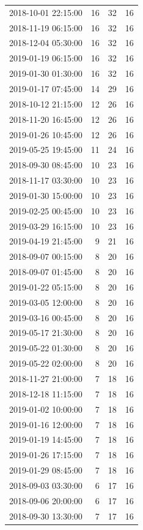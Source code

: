 \begin{tabular}{lrrr}
2018-10-01 22:15:00 & 16 & 32 & 16 \\
2018-11-19 06:15:00 & 16 & 32 & 16 \\
2018-12-04 05:30:00 & 16 & 32 & 16 \\
2019-01-19 06:15:00 & 16 & 32 & 16 \\
2019-01-30 01:30:00 & 16 & 32 & 16 \\
2019-01-17 07:45:00 & 14 & 29 & 16 \\
2018-10-12 21:15:00 & 12 & 26 & 16 \\
2018-11-20 16:45:00 & 12 & 26 & 16 \\
2019-01-26 10:45:00 & 12 & 26 & 16 \\
2019-05-25 19:45:00 & 11 & 24 & 16 \\
2018-09-30 08:45:00 & 10 & 23 & 16 \\
2018-11-17 03:30:00 & 10 & 23 & 16 \\
2019-01-30 15:00:00 & 10 & 23 & 16 \\
2019-02-25 00:45:00 & 10 & 23 & 16 \\
2019-03-29 16:15:00 & 10 & 23 & 16 \\
2019-04-19 21:45:00 & 9 & 21 & 16 \\
2018-09-07 00:15:00 & 8 & 20 & 16 \\
2018-09-07 01:45:00 & 8 & 20 & 16 \\
2019-01-22 05:15:00 & 8 & 20 & 16 \\
2019-03-05 12:00:00 & 8 & 20 & 16 \\
2019-03-16 00:45:00 & 8 & 20 & 16 \\
2019-05-17 21:30:00 & 8 & 20 & 16 \\
2019-05-22 01:30:00 & 8 & 20 & 16 \\
2019-05-22 02:00:00 & 8 & 20 & 16 \\
2018-11-27 21:00:00 & 7 & 18 & 16 \\
2018-12-18 11:15:00 & 7 & 18 & 16 \\
2019-01-02 10:00:00 & 7 & 18 & 16 \\
2019-01-16 12:00:00 & 7 & 18 & 16 \\
2019-01-19 14:45:00 & 7 & 18 & 16 \\
2019-01-26 17:15:00 & 7 & 18 & 16 \\
2019-01-29 08:45:00 & 7 & 18 & 16 \\
2018-09-03 03:30:00 & 6 & 17 & 16 \\
2018-09-06 20:00:00 & 6 & 17 & 16 \\
2018-09-30 13:30:00 & 7 & 17 & 16 \\

\end{tabular}
